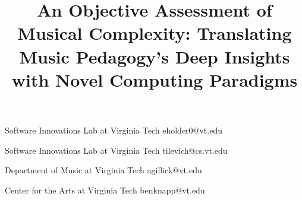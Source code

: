 \documentclass[10pt]{sigplanconf}
\begin{document}
\permissiontopublish
{} 

\title{An Objective Assessment of Musical Complexity: Translating Music Pedagogy's Deep Insights with Novel Computing Paradigms}

					 {Software Innovations Lab at Virginia Tech}
					 {eholder0@vt.edu}
					 
					 {Software Innovations Lab at Virginia Tech}
					 {tilevich@cs.vt.edu}
					 
					 {Department of Music at Virginia Tech}
					 {agillick@vt.edu}
					 
					 {Center for the Arts at Virginia Tech}
					 {benknapp@vt.edu}

\maketitle
\end{document}
